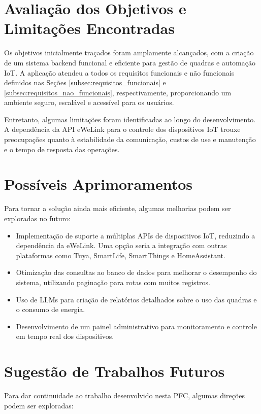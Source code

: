 \section{Avaliação dos Objetivos e Limitações Encontradas}

Os objetivos inicialmente traçados foram amplamente alcançados, com a criação de um sistema backend funcional e eficiente para gestão de quadras e automação \acrshort{IoT}. A aplicação atendeu a todos os requisitos funcionais e não funcionais definidos nas Seções \ref{subsec:requisitos_funcionais} e \ref{subsec:requisitos_nao_funcionais}, respectivamente, proporcionando um ambiente seguro, escalável e acessível para os usuários.

Entretanto, algumas limitações foram identificadas ao longo do desenvolvimento. A dependência da API eWeLink para o controle dos dispositivos \acrshort{IoT} trouxe preocupações quanto à estabilidade da comunicação, custos de use e manutenção e o tempo de resposta das operações.

\section{Possíveis Aprimoramentos}

Para tornar a solução ainda mais eficiente, algumas melhorias podem ser exploradas no futuro:

\begin{itemize}
  \item Implementação de suporte a múltiplas APIs de dispositivos \acrshort{IoT}, reduzindo a dependência da eWeLink. Uma opção seria a integração com outras plataformas como Tuya, SmartLife, SmartThings e HomeAssistant.
  \item Otimização das consultas ao banco de dados para melhorar o desempenho do sistema, utilizando paginação para rotas com muitos registros.
  \item Uso de \acrfull{LLMs} para criação de relatórios detalhados sobre o uso das quadras e o consumo de energia.
  \item Desenvolvimento de um painel administrativo para monitoramento e controle em tempo real dos dispositivos.
\end{itemize}

\section{Sugestão de Trabalhos Futuros}

Para dar continuidade ao trabalho desenvolvido nesta \acrshort{PFC}, algumas direções podem ser exploradas:


